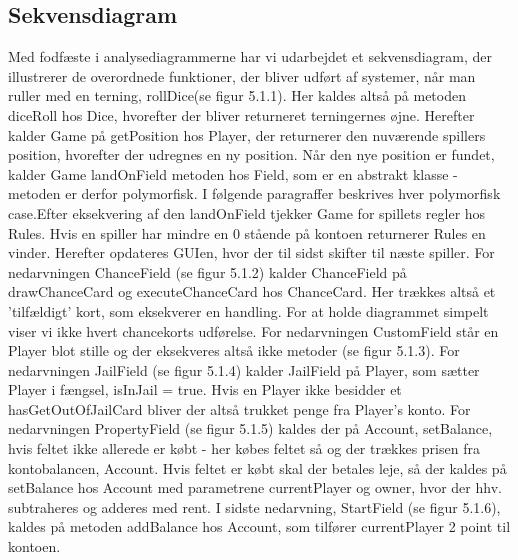 \begin{flushleft}
\doublespacing
\subsection{Sekvensdiagram}
Med fodfæste i analysediagrammerne har vi udarbejdet et sekvensdiagram, der illustrerer de overordnede funktioner, der bliver udført af systemer, når man ruller med en terning, rollDice(se figur 5.1.1). Her kaldes altså på metoden diceRoll hos Dice, hvorefter der bliver returneret terningernes øjne. Herefter kalder Game på getPosition hos Player, der returnerer den nuværende spillers position, hvorefter der udregnes en ny position. Når den nye position er fundet, kalder Game landOnField metoden hos Field, som er en abstrakt klasse - metoden er derfor polymorfisk. I følgende paragraffer beskrives hver polymorfisk case.Efter eksekvering af den landOnField tjekker Game for spillets regler hos Rules. Hvis en spiller har mindre en 0 stående på kontoen returnerer Rules en vinder. Herefter opdateres GUIen, hvor der til sidst skifter til næste spiller.
\addlinespace
For nedarvningen ChanceField (se figur 5.1.2) kalder ChanceField på drawChanceCard og executeChanceCard hos ChanceCard. Her trækkes altså et 'tilfældigt' kort, som eksekverer en handling. For at holde diagrammet simpelt viser vi ikke hvert chancekorts udførelse.
\addlinespace
For nedarvningen CustomField står en Player blot stille og der eksekveres altså ikke metoder (se figur 5.1.3).
\addlinespace
For nedarvningen JailField (se figur 5.1.4) kalder JailField på Player, som sætter Player i fængsel, isInJail = true. Hvis en Player ikke besidder et hasGetOutOfJailCard bliver der altså trukket penge fra Player's konto.
\addlinespace
For nedarvningen PropertyField (se figur 5.1.5) kaldes der på Account, setBalance, hvis feltet ikke allerede er købt - her købes feltet så og der trækkes prisen fra kontobalancen, Account. Hvis feltet er købt skal der betales leje, så der kaldes på setBalance hos Account med parametrene currentPlayer og owner, hvor der hhv. subtraheres og adderes med rent.
\addlinespace
I sidste nedarvning, StartField (se figur 5.1.6), kaldes på metoden addBalance hos Account, som tilfører currentPlayer 2 point til kontoen.

\end{flushleft}
